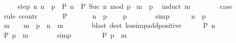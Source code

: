 \begin{isabellebody}
\ \ \ \ \ step{\isacharcolon}{\kern0pt}\ {\isachardoublequoteopen}{\isasymAnd}n{\isachardot}{\kern0pt}\ n\ {\isacharless}{\kern0pt}\ p\ {\isasymLongrightarrow}\ P\ n\ {\isasymLongrightarrow}\ P\ {\isacharparenleft}{\kern0pt}Suc\ n\ mod\ p{\isacharparenright}{\kern0pt}{\isachardoublequoteclose}\isanewline
%
\isadelimproof
%
\endisadelimproof
%
\isatagproof
{}\isamarkupfalse%
\ {\isacartoucheopen}m\ {\isacharless}{\kern0pt}\ p{\isacartoucheclose}\ \isamarkupfalse%
\ {\isacharparenleft}{\kern0pt}induct\ m{\isacharparenright}{\kern0pt}\isanewline
\ \ \isamarkupfalse%
\ {}\isanewline
\ \ \isamarkupfalse%
\ {\isacharquery}{\kern0pt}case\isanewline
\ \ \isamarkupfalse%
\ {\isacharparenleft}{\kern0pt}rule\ ccontr{\isacharparenright}{\kern0pt}\isanewline
\ \ \ \ \isamarkupfalse%
\ {\isachardoublequoteopen}{\isasymnot}\ P\ {}{\isachardoublequoteclose}\isanewline
\ \ \ \ \isamarkupfalse%
\ {\isacartoucheopen}n\ {\isacharless}{\kern0pt}\ p{\isacartoucheclose}\ \isamarkupfalse%
\ {\isachardoublequoteopen}{}\ {\isacharless}{\kern0pt}\ p{\isachardoublequoteclose}\isanewline
\ \ \ \ \ \ \isamarkupfalse%
\ simp\isanewline
\ \ \ \ \isamarkupfalse%
\ {\isacartoucheopen}n\ {\isacharless}{\kern0pt}\ p{\isacartoucheclose}\ \isamarkupfalse%
\ m\ \ {\isachardoublequoteopen}{}\ {\isacharless}{\kern0pt}\ m{\isachardoublequoteclose}\ \ {\isachardoublequoteopen}p\ {\isacharequal}{\kern0pt}\ n\ {\isacharplus}{\kern0pt}\ m{\isachardoublequoteclose}\isanewline
\ \ \ \ \ \ \isamarkupfalse%
\ {\isacharparenleft}{\kern0pt}blast\ dest{\isacharcolon}{\kern0pt}\ less{\isacharunderscore}{\kern0pt}imp{\isacharunderscore}{\kern0pt}add{\isacharunderscore}{\kern0pt}positive{\isacharparenright}{\kern0pt}\isanewline
\ \ \ \ \isamarkupfalse%
\ {\isacartoucheopen}P\ n{\isacartoucheclose}\ \isamarkupfalse%
\ {\isachardoublequoteopen}P\ {\isacharparenleft}{\kern0pt}p\ {\isacharminus}{\kern0pt}\ m{\isacharparenright}{\kern0pt}{\isachardoublequoteclose}\isanewline
\ \ \ \ \ \ \isamarkupfalse%
\ simp\isanewline
\ \ \ \ \isamarkupfalse%
\ \isamarkupfalse%
\ {\isachardoublequoteopen}{\isasymnot}\ P\ {\isacharparenleft}{\kern0pt}p\ {\isacharminus}{\kern0pt}\ m{\isacharparenright}{\kern0pt}{\isachardoublequoteclose}\isanewline

\end{isabellebody}
